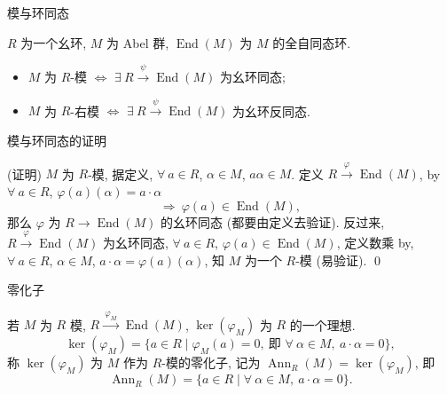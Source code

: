 
\begin{frame}{模与环同态}

$R$ 为一个幺环, $M$ 为 Abel 群, $\operatorname{End}(M)$ 为 $M$
的全自同态环.

\begin{prop}[模与环同态]
\begin{itemize}
\item $M$ 为 $R$-模 $\iff$ $\exists\ R \xrightarrow{\ \psi\ } \operatorname{End}(M)$
  为幺环同态;
\item $M$ 为 $R$-右模 $\iff$ $\exists\ R \xrightarrow{\ \psi\ } \operatorname{End}(M)$
  为幺环反同态.
\end{itemize}
\end{prop}

\end{frame}


\begin{frame}{模与环同态的证明}

\startproof[bg=yellow, fg=red](证明)
$M$ 为 $R$-模, 据定义, $\forall\ a \in R$, $\alpha \in M$, $a\alpha \in M$.
定义 $R \xrightarrow{\ \varphi\ } \operatorname{End}(M)$, by
$\forall\ a \in R$, $\varphi(a)(\alpha) = a \cdot \alpha$
\[
\Longrightarrow\ \varphi(a) \in \operatorname{End}(M),
\]
那么 $\varphi$ 为 $R \to \operatorname{End}(M)$ 的幺环同态
(都要由定义去验证).
\pause
反过来, $R \xrightarrow{\ \varphi\ } \operatorname{End}(M)$ 为幺环同态,
$\forall\ a \in R$, $\varphi(a) \in \operatorname{End}(M)$,
定义数乘 by, $\forall\ a \in R$, $\alpha \in M$,
$a \cdot \alpha = \varphi(a)(\alpha)$,
知 $M$ 为一个 $R$-模 (易验证).
\qed

\end{frame}


\begin{frame}{零化子}

若 $M$ 为 $R$ 模, $R \xrightarrow{\ \varphi_M\ } \operatorname{End}(M)$,
$\ker(\varphi_M)$ 为 $R$ 的一个理想.
\[
\ker(\varphi_M) = \big\{ a \in R \;\big|\; \varphi_M(a) = 0,\
\text{即 } \forall\ \alpha \in M,\ a \cdot \alpha = 0 \big\},
\]
称 $\ker(\varphi_M)$ 为 $M$ 作为 $R$-模的\alert{零化子}, 记为
$\operatorname{Ann}_R(M) = \ker(\varphi_M)$, 即
\[
\operatorname{Ann}_R(M)
= \big\{ a \in R \;\big|\; \forall\ \alpha \in M,\ a \cdot \alpha = 0 \big\} .
\]

\end{frame}

